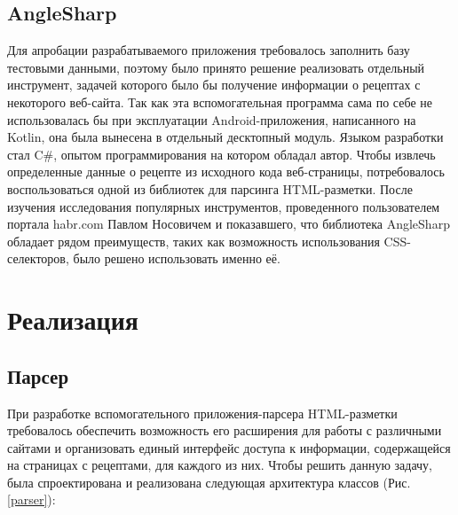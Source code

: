 \documentclass[14pt]{matmex-diploma-custom}
\begin{document}
\subsection*{AngleSharp}

Для апробации разрабатываемого приложения требовалось заполнить базу тестовыми данными, поэтому было принято решение реализовать отдельный инструмент, задачей которого было бы получение информации о рецептах с некоторого веб-сайта. Так как эта вспомогательная программа сама по себе не использовалась бы при эксплуатации Android-приложения, написанного на Kotlin, она была вынесена в отдельный десктопный модуль. Языком разработки стал C\#, опытом программирования на котором обладал автор. Чтобы извлечь определенные данные о рецепте из исходного кода веб-страницы, потребовалось воспользоваться одной из библиотек для парсинга HTML-разметки. После изучения исследования популярных инструментов, проведенного пользователем портала habr.com Павлом Носовичем \cite{anglesharp} и показавшего, что библиотека AngleSharp обладает рядом преимуществ, таких как возможность использования CSS-селекторов, было решено использовать именно её.

\section*{Реализация}


\subsection*{Парсер}

При разработке вспомогательного приложения-парсера HTML-разметки требовалось обеспечить возможность его расширения для работы с различными сайтами и организовать единый интерфейс доступа к информации, содержащейся на страницах с рецептами, для каждого из них. Чтобы решить данную задачу, была спроектирована и реализована следующая архитектура классов (Рис. \ref{parser}):
\end{document}
